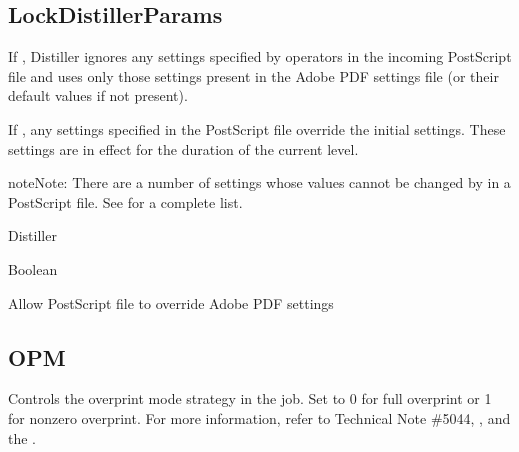 \documentclass[letterpaper,12pt,english,openany,oneside]{sphinxmanual}
\begin{document}
\subsection{LockDistillerParams}
\label{\detokenize{PDF_Create_CommonSettings:lockdistillerparams}}
If  , Distiller ignores any settings specified by  operators in the incoming PostScript file and uses only those settings present in the Adobe PDF settings file (or their default values if not present).

If  , any settings specified in the PostScript file override the initial settings. These settings are in effect for the duration of the current  level.

\begin{sphinxadmonition}{note}{Note:}
There are a number of settings whose values cannot be changed by  in a PostScript file. See  for a complete list.
\end{sphinxadmonition}
\label{\detokenize{PDF_Create_CommonSettings:supported-by-97}}

Distiller

\label{\detokenize{PDF_Create_CommonSettings:type-96}}

Boolean

\label{\detokenize{PDF_Create_CommonSettings:ui-name-79}}

Allow PostScript file to override Adobe PDF settings

\label{\detokenize{PDF_Create_CommonSettings:default-value-91}}

\begin{sphinxVerbatim}[commandchars=\\\{\}]
\end{sphinxVerbatim}




\subsection{OPM}
\label{\detokenize{PDF_Create_CommonSettings:opm}}
Controls the overprint mode strategy in the job. Set to 0 for full overprint or 1 for non\sphinxhyphen{}zero overprint. For more information, refer to Technical Note \#5044,  , and the  .
\end{document}
